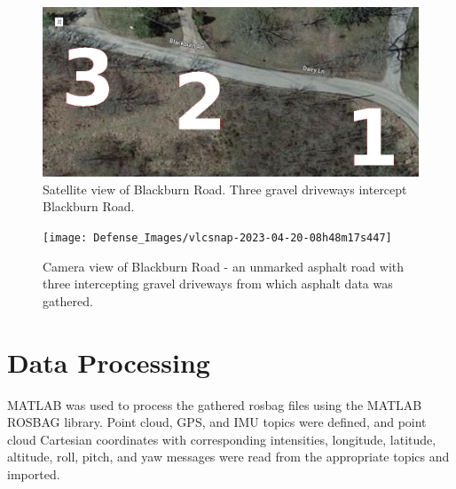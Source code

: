\documentclass[numbered,pdftex]{ohio-etd}
\begin{document}
{{		\begin{figure}[H]
			\centering
			\includegraphics[width=0.75\linewidth]{Defense_Images/three_driveways_sat}
			\caption[Satellite View of Blackburn Road]{Satellite view of Blackburn Road. Three gravel driveways intercept Blackburn Road. }
			\label{fig:three_driveways_sat}
		\end{figure}
		
		
		\begin{figure}[H]
			\centering
			\texttt{[image: Defense\_Images/vlcsnap-2023-04-20-08h48m17s447]}
			\caption[Blackburn Road Camera View]{Camera view of Blackburn Road - an unmarked asphalt road with three intercepting gravel driveways from which asphalt data was gathered.}
			\label{fig:Blackburn_Road_View}
		\end{figure}
					
	} %
		
	\section{Data Processing}\label{sec:data_processing}{

		{MATLAB was used to process the gathered rosbag files using the MATLAB ROSBAG library. Point cloud, GPS, and IMU topics were defined, and point cloud Cartesian coordinates with corresponding intensities, longitude, latitude, altitude, roll, pitch, and yaw messages were read from the appropriate topics and imported.}

	} %
	
%			
%			
	
}
\end{document}
